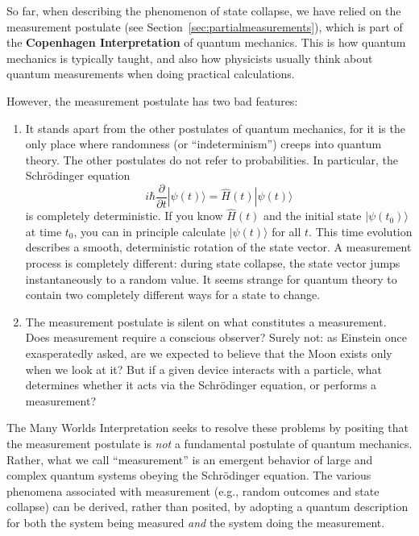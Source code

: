 \documentclass[pra,12pt]{revtex4-2}
\begin{document}
So far, when describing the phenomenon of state collapse, we have
relied on the measurement postulate (see
Section~\ref{sec:partialmeasurements}), which is part of the
\textbf{Copenhagen Interpretation} of quantum mechanics.  This is how
quantum mechanics is typically taught, and also how physicists usually
think about quantum measurements when doing practical calculations.

However, the measurement postulate has two bad features:

\begin{enumerate}
\item It stands apart from the other postulates of quantum mechanics,
  for it is the only place where randomness (or ``indeterminism'')
  creeps into quantum theory.  The other postulates do not refer to
  probabilities.  In particular, the Schr\"odinger equation
\begin{equation}
  i\hbar\frac{\partial}{\partial t}|\psi(t)\rangle = \hat{H}(t) |\psi(t)\rangle
\end{equation}
is completely deterministic.  If you know $\hat{H}(t)$ and the initial
state $|\psi(t_0)\rangle$ at time $t_0$, you can in principle
calculate $|\psi(t)\rangle$ for all $t$.  This time evolution
describes a smooth, deterministic rotation of the state vector.  A
measurement process is completely different: during state collapse,
the state vector jumps instantaneously to a random value.  It seems
strange for quantum theory to contain two completely different ways
for a state to change.

\item The measurement postulate is silent on what constitutes a
  measurement.  Does measurement require a conscious observer?  Surely
  not: as Einstein once exasperatedly asked, are we expected to
  believe that the Moon exists only when we look at it?  But if a
  given device interacts with a particle, what determines whether it
  acts via the Schr\"odinger equation, or performs a measurement?
\end{enumerate}

The Many Worlds Interpretation seeks to resolve these problems by
positing that the measurement postulate is \textit{not} a fundamental
postulate of quantum mechanics.  Rather, what we call ``measurement''
is an emergent behavior of large and complex quantum systems obeying
the Schr\"odinger equation.  The various phenomena associated with
measurement (e.g., random outcomes and state collapse) can be derived,
rather than posited, by adopting a quantum description for both the
system being measured \textit{and} the system doing the measurement.
\end{document}
